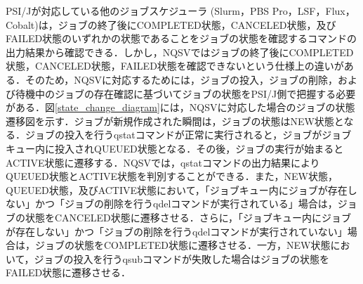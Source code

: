 PSI/Jが対応している他のジョブスケジューラ (Slurm\cite{Slurm}，PBS Pro\cite{PBS_Pro}，LSF\cite{LSF}，Flux\cite{Flux}，Cobalt\cite{Cobalt})は，ジョブの終了後にCOMPLETED状態，CANCELED状態，及びFAILED状態のいずれかの状態であることをジョブの状態を確認するコマンドの出力結果から確認できる．しかし，NQSVではジョブの終了後にCOMPLETED状態，CANCELED状態，FAILED状態を確認できないという仕様上の違いがある．そのため，NQSVに対応するためには，ジョブの投入，ジョブの削除，および待機中のジョブの存在確認に基づいてジョブの状態をPSI/J側で把握する必要がある．図\ref{state_change_diagram}には，NQSVに対応した場合のジョブの状態遷移図を示す．ジョブが新規作成された瞬間は，ジョブの状態はNEW状態となる．ジョブの投入を行うqstatコマンドが正常に実行されると，ジョブがジョブキュー内に投入されQUEUED状態となる．その後，ジョブの実行が始まるとACTIVE状態に遷移する．NQSVでは，qstatコマンドの出力結果によりQUEUED状態とACTIVE状態を判別することができる．また，NEW状態，QUEUED状態，及びACTIVE状態において，「ジョブキュー内にジョブが存在しない」かつ「ジョブの削除を行うqdelコマンドが実行されている」場合は，ジョブの状態をCANCELED状態に遷移させる．さらに，「ジョブキュー内にジョブが存在しない」かつ「ジョブの削除を行うqdelコマンドが実行されていない」場合は，ジョブの状態をCOMPLETED状態に遷移させる．一方，NEW状態において，ジョブの投入を行うqsubコマンドが失敗した場合はジョブの状態をFAILED状態に遷移させる．\par
